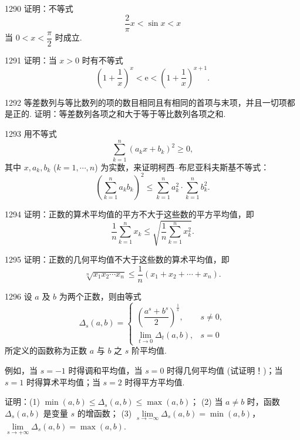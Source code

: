 \begin{prob}[M]{1290}
证明：不等式
\[
\frac{2}{\pi} x < \sin x < x
\]
当 $0 < x < \dfrac{\pi}{2}$ 时成立.
\end{prob}

\begin{prob}[M]{1291}
证明：当 $x > 0$ 时有不等式
\[
\left(1 + \frac{1}{x}\right)^x < \mathrm{e} < \left(1 + \frac{1}{x}\right)^{x+1}.
\]
\end{prob}

\begin{prob}[M]{1292}
等差数列与等比数列的项的数目相同且有相同的首项与末项，并且一切项都是正的. 证明：等差数列各项之和大于等于等比数列各项之和.
\end{prob}

\begin{prob}[M]{1293}
用不等式
\[
\sum_{k=1}^{n} (a_k x + b_k)^2 \geqslant 0,
\]
其中 $x, a_k, b_k$ ($k = 1, \cdots, n$) 为实数，来证明柯西--布尼亚科夫斯基不等式：
\[
\left(\sum_{k=1}^{n} a_k b_k\right)^2 \leqslant \sum_{k=1}^{n} a_k^2 \cdot \sum_{k=1}^{n} b_k^2.
\]
\end{prob}

\begin{prob}[M]{1294}
证明：正数的算术平均值的平方不大于这些数的平方平均值，即
\[
\frac{1}{n}\sum_{k=1}^{n} x_k \leqslant \sqrt{\frac{1}{n}\sum_{k=1}^{n} x_k^2}.
\]
\end{prob}

\begin{prob}[M]{1295}
证明：正数的几何平均值不大于这些数的算术平均值，即
\[
\sqrt[n]{x_1 x_2 \cdots x_n} \leqslant \frac{1}{n}(x_1 + x_2 + \cdots + x_n).
\]
\end{prob}

\begin{prob}[L]{1296}
设 $a$ 及 $b$ 为两个正数，则由等式
\[
\Delta_s(a, b) = \begin{cases}
\left(\dfrac{a^s + b^s}{2}\right)^{\frac{1}{s}}, & s \neq 0, \\
\lim\limits_{t \to 0} \Delta_t(a, b), & s = 0
\end{cases}
\]
所定义的函数称为正数 $a$ 与 $b$ 之 $s$ 阶平均值.

例如，当 $s = -1$ 时得调和平均值，当 $s = 0$ 时得几何平均值 (试证明！)；当 $s = 1$ 时得算术平均值；当 $s = 2$ 时得平方平均值.

证明：(1) $\min(a, b) \leqslant \Delta_s(a, b) \leqslant \max(a, b)$；
(2) 当 $a \neq b$ 时，函数 $\Delta_s(a, b)$ 是变量 $s$ 的增函数；
(3) $\lim\limits_{s \to -\infty} \Delta_s(a, b) = \min(a, b)$，$\lim\limits_{s \to +\infty} \Delta_s(a, b) = \max(a, b)$.
\end{prob}

